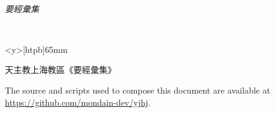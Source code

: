 \documentclass[openany,twoside,12pt]{utbook}
\begin{document}
\thispagestyle{empty}
~\vfill {\Huge\it\centering 要\quad 經\quad 彙\quad 集\par~\par} \vfill

\newpage\restoregeometry
\thispagestyle{empty}
\begin{minipage}<y>[htpb]{65mm}
\vspace{9.5cm}
{\centering \fontsize{7pt}{8pt}\selectfont 天主教上海教區《要經彙集》

The source and scripts used to compose this document are available at \url{https://github.com/mondain-dev/yjhj}.\par}
\end{minipage}
\frontmatter
\renewcommand\thepage{\rensuji{\arabic{page}}\relax}
\begin{multicols}{2}
\tableofcontents
\end{multicols}

\mainmatter
\renewcommand\thepage{\zhdigits{\arabic{page}}\relax}

















\end{document}
